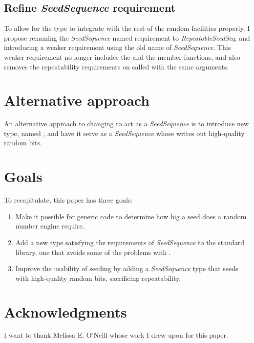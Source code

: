 \documentclass{wg21}
\begin{document}
\hypertarget{solution-3-different-requirement}{%
    \subsection{Refine \emph{SeedSequence} requirement}
\label{solution-3-different-requirement}}

To allow for the type  to integrate with
the rest of the random facilities properly, I propose renaming the
\emph{SeedSequence} named requirement to \emph{RepeatableSeedSeq}, and
introducing a weaker requirement using the old name of \emph{SeedSequence}.
This weaker requirement no longer includes the  and the
 member functions, and also removes the repeatability
requirements on  called with the same arguments.


\hypertarget{alternative-approach}{%
    \section{Alternative approach}\label{alternative-approach}}

An alternative approach to changing  to act
as a \emph{SeedSequence} is to introduce new type, named
, and have it serve as a \emph{SeedSequence}
whose  writes out high-quality random bits.

\hypertarget{goals}{%
    \section{Goals}\label{goals}}

To recapitulate, this paper has three goals:
\begin{enumerate}
    \item Make it possible for generic code to determine how big a seed
    does a random number engine require.
    \item Add a new type satisfying the requirements of \emph{SeedSequence}
    to the standard library, one that avoids some of the problems with
    .
    \item Improve the usability of seeding by adding a \emph{SeedSequence}
    type that seeds with high-quality random bits, sacrificing
    repeatability.
\end{enumerate}


\hypertarget{acknowledgments}{
\section{Acknowledgments}
\label{acknowledgments}}

I want to thank Melissa E. O'Neill whose work I drew upon for this paper.
\end{document}
